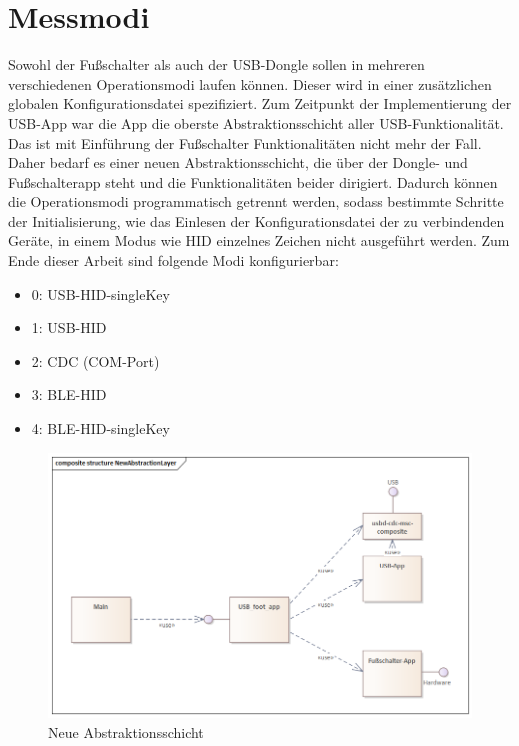 \section{Messmodi}
Sowohl der Fußschalter als auch der USB-Dongle sollen in mehreren verschiedenen Operationsmodi laufen können. Dieser wird in einer zusätzlichen globalen Konfigurationsdatei spezifiziert. Zum Zeitpunkt der Implementierung der USB-App war die App die oberste Abstraktionsschicht aller USB-Funktionalität. Das ist mit Einführung der Fußschalter Funktionalitäten nicht mehr der Fall. Daher bedarf es einer neuen Abstraktionsschicht, die über der Dongle- und Fußschalterapp steht und die Funktionalitäten beider dirigiert. Dadurch können die Operationsmodi programmatisch getrennt werden, sodass bestimmte Schritte der Initialisierung, wie das Einlesen der Konfigurationsdatei der zu verbindenden Geräte, in einem Modus wie HID einzelnes Zeichen nicht ausgeführt werden. Zum Ende dieser Arbeit sind folgende Modi konfigurierbar:
\begin{itemize}
	\item 0: USB-HID-singleKey
	\item 1: USB-HID
	\item 2: CDC (COM-Port)
	\item 3: BLE-HID
	\item 4: BLE-HID-singleKey
\end{itemize}

\begin{figure}[H] 
	\centering
	\includegraphics[width=\textwidth]{figures/NewAbstractionLayer.png}
	\caption{Neue Abstraktionsschicht}
\end{figure}

